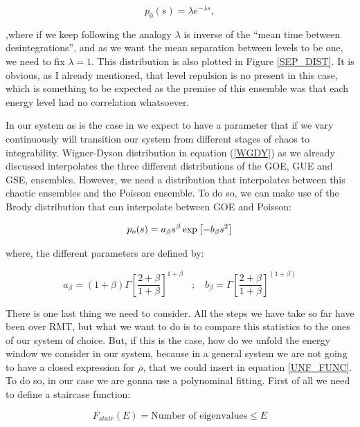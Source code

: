 \documentclass[11pt,a4paper]{article}
\begin{document}
\begin{equation}
    p_0(s)=\lambda e^{-\lambda s},
\end{equation}

{\noindent ,where if we keep following the analogy $\lambda$ is inverse of the \textquotedblleft mean time between desintegrations\textquotedblright, and as we want the mean separation between levels to be one, we need to fix $\lambda=1$. This distribution is also plotted in Figure \ref{SEP_DIST}. It is obvious, as I already mentioned, that level repulsion is no present in this case, which is something to be expected as the premise of this ensemble was that each energy level had no correlation whatsoever.}

In our system as is the case in \cite{Jeong_2025} we expect to have a parameter that if we vary continuously will transition our system from different stages of chaos to integrability. Wigner-Dyson distribution in equation (\ref{WGDY}) as we already discussed interpolates the three different distributions of the GOE, GUE and GSE, ensembles. However, we need a distribution that interpolates between this chaotic ensembles and the Poisson ensemble. To do so, we can make use of the Brody \cite{brody_statistical_1973} distribution that can interpolate between GOE and Poisson:

\begin{equation}\LA{BRODYDIST}
    p_o(s) = a_\beta s^\beta \exp\left[-b_\beta s^2\right]
\end{equation}

{\noindent where, the different parameters are defined by:}

\begin{equation}
    a_\beta=(1+\beta)\Gamma\left[\frac{2+\beta}{1+\beta}\right]^{1+\beta} ~~~~;~~~~ b_\beta=\Gamma\left[\frac{2+\beta}{1+\beta}\right]^{(1+\beta)}
\end{equation}


There is one last thing we need to consider. All the steps we have take so far have been over RMT, but what we want to do is to compare this statistics to the ones of our system of choice. But, if this is the case, how do we unfold the energy window we consider in our system, because in a general system we are not going to have a closed expression for $\overline{\rho}$, that we could insert in equation \ref{UNF_FUNC}. To do so, in our case we are gonna use a polynominal fitting. First of all we need to define a staircase function:

\begin{equation}
    F_{stair}(E) = \text{Number of eigenvalues}\leq E
\end{equation}
\end{document}
